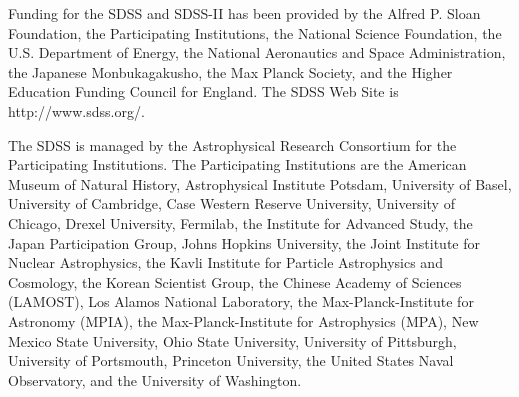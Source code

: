 \documentclass[10pt,apjl]{emulateapj}
\begin{document}
Funding for the SDSS and SDSS-II has been provided by the Alfred P. Sloan Foundation, the Participating Institutions, the National Science Foundation, the U.S. Department of Energy, the National Aeronautics and Space Administration, the Japanese Monbukagakusho, the Max Planck Society, and the Higher Education Funding Council for England. The SDSS Web Site is http://www.sdss.org/.

The SDSS is managed by the Astrophysical Research Consortium for the Participating Institutions. The Participating Institutions are the American Museum of Natural History, Astrophysical Institute Potsdam, University of Basel, University of Cambridge, Case Western Reserve University, University of Chicago, Drexel University, Fermilab, the Institute for Advanced Study, the Japan Participation Group, Johns Hopkins University, the Joint Institute for Nuclear Astrophysics, the Kavli Institute for Particle Astrophysics and Cosmology, the Korean Scientist Group, the Chinese Academy of Sciences (LAMOST), Los Alamos National Laboratory, the Max-Planck-Institute for Astronomy (MPIA), the Max-Planck-Institute for Astrophysics (MPA), New Mexico State University, Ohio State University, University of Pittsburgh, University of Portsmouth, Princeton University, the United States Naval Observatory, and the University of Washington.

\vspace{2em}
\end{document}

